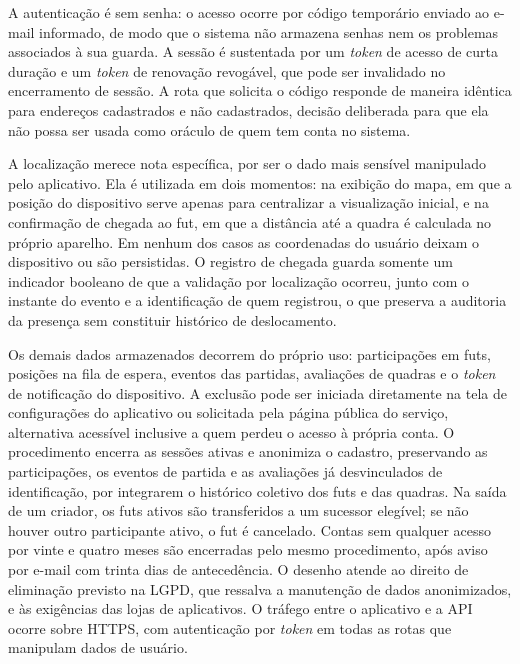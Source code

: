         A autenticação é sem senha: o acesso ocorre por código temporário enviado ao e-mail informado, de modo que o sistema não armazena senhas nem os problemas associados à sua guarda. A sessão é sustentada por um \textit{token} de acesso de curta duração e um \textit{token} de renovação revogável, que pode ser invalidado no encerramento de sessão. A rota que solicita o código responde de maneira idêntica para endereços cadastrados e não cadastrados, decisão deliberada para que ela não possa ser usada como oráculo de quem tem conta no sistema.

        A localização merece nota específica, por ser o dado mais sensível manipulado pelo aplicativo. Ela é utilizada em dois momentos: na exibição do mapa, em que a posição do dispositivo serve apenas para centralizar a visualização inicial, e na confirmação de chegada ao fut, em que a distância até a quadra é calculada no próprio aparelho. Em nenhum dos casos as coordenadas do usuário deixam o dispositivo ou são persistidas. O registro de chegada guarda somente um indicador booleano de que a validação por localização ocorreu, junto com o instante do evento e a identificação de quem registrou, o que preserva a auditoria da presença sem constituir histórico de deslocamento.

        Os demais dados armazenados decorrem do próprio uso: participações em futs, posições na fila de espera, eventos das partidas, avaliações de quadras e o \textit{token} de notificação do dispositivo. A exclusão pode ser iniciada diretamente na tela de configurações do aplicativo ou solicitada pela página pública do serviço, alternativa acessível inclusive a quem perdeu o acesso à própria conta. O procedimento encerra as sessões ativas e anonimiza o cadastro, preservando as participações, os eventos de partida e as avaliações já desvinculados de identificação, por integrarem o histórico coletivo dos futs e das quadras. Na saída de um criador, os futs ativos são transferidos a um sucessor elegível; se não houver outro participante ativo, o fut é cancelado. Contas sem qualquer acesso por vinte e quatro meses são encerradas pelo mesmo procedimento, após aviso por e-mail com trinta dias de antecedência. O desenho atende ao direito de eliminação previsto na LGPD, que ressalva a manutenção de dados anonimizados, e às exigências das lojas de aplicativos. O tráfego entre o aplicativo e a API ocorre sobre HTTPS, com autenticação por \textit{token} em todas as rotas que manipulam dados de usuário.

